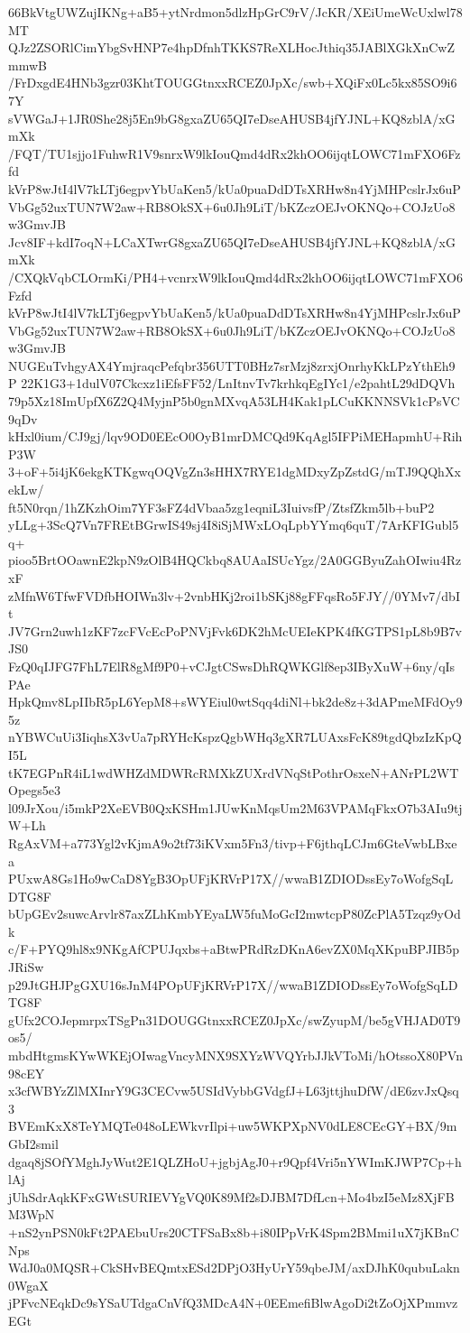 66BkVtgUWZujIKNg+aB5+ytNrdmon5dlzHpGrC9rV/JcKR/XEiUmeWcUxlwl78MT
QJz2ZSORlCimYbgSvHNP7e4hpDfnhTKKS7ReXLHocJthiq35JABlXGkXnCwZmmwB
/FrDxgdE4HNb3gzr03KhtTOUGGtnxxRCEZ0JpXc/swb+XQiFx0Lc5kx85SO9i67Y
sVWGaJ+1JR0She28j5En9bG8gxaZU65QI7eDseAHUSB4jfYJNL+KQ8zblA/xGmXk
/FQT/TU1sjjo1FuhwR1V9snrxW9lkIouQmd4dRx2khOO6ijqtLOWC71mFXO6Fzfd
kVrP8wJtI4lV7kLTj6egpvYbUaKen5/kUa0puaDdDTsXRHw8n4YjMHPcslrJx6uP
VbGg52uxTUN7W2aw+RB8OkSX+6u0Jh9LiT/bKZczOEJvOKNQo+COJzUo8w3GmvJB
Jcv8IF+kdI7oqN+LCaXTwrG8gxaZU65QI7eDseAHUSB4jfYJNL+KQ8zblA/xGmXk
/CXQkVqbCLOrmKi/PH4+vcnrxW9lkIouQmd4dRx2khOO6ijqtLOWC71mFXO6Fzfd
kVrP8wJtI4lV7kLTj6egpvYbUaKen5/kUa0puaDdDTsXRHw8n4YjMHPcslrJx6uP
VbGg52uxTUN7W2aw+RB8OkSX+6u0Jh9LiT/bKZczOEJvOKNQo+COJzUo8w3GmvJB
NUGEuTvhgyAX4YmjraqcPefqbr356UTT0BHz7srMzj8zrxjOnrhyKkLPzYthEh9P
22K1G3+1dulV07Ckcxz1iEfsFF52/LnItnvTv7krhkqEgIYc1/e2pahtL29dDQVh
79p5Xz18ImUpfX6Z2Q4MyjnP5b0gnMXvqA53LH4Kak1pLCuKKNNSVk1cPsVC9qDv
kHxl0ium/CJ9gj/lqv9OD0EEcO0OyB1mrDMCQd9KqAgl5IFPiMEHapmhU+RihP3W
3+oF+5i4jK6ekgKTKgwqOQVgZn3sHHX7RYE1dgMDxyZpZstdG/mTJ9QQhXxekLw/
ft5N0rqn/1hZKzhOim7YF3sFZ4dVbaa5zg1eqniL3IuivsfP/ZtsfZkm5lb+buP2
yLLg+3ScQ7Vn7FREtBGrwIS49sj4I8iSjMWxLOqLpbYYmq6quT/7ArKFIGubl5q+
pioo5BrtOOawnE2kpN9zOlB4HQCkbq8AUAaISUcYgz/2A0GGByuZahOIwiu4RzxF
zMfnW6TfwFVDfbHOIWn3lv+2vnbHKj2roi1bSKj88gFFqsRo5FJY//0YMv7/dbIt
JV7Grn2uwh1zKF7zcFVcEcPoPNVjFvk6DK2hMcUEIeKPK4fKGTPS1pL8b9B7vJS0
FzQ0qIJFG7FhL7ElR8gMf9P0+vCJgtCSwsDhRQWKGlf8ep3IByXuW+6ny/qIsPAe
HpkQmv8LpIIbR5pL6YepM8+sWYEiul0wtSqq4diNl+bk2de8z+3dAPmeMFdOy95z
nYBWCuUi3IiqhsX3vUa7pRYHcKspzQgbWHq3gXR7LUAxsFcK89tgdQbzIzKpQI5L
tK7EGPnR4iL1wdWHZdMDWRcRMXkZUXrdVNqStPothrOsxeN+ANrPL2WTOpegs5e3
l09JrXou/i5mkP2XeEVB0QxKSHm1JUwKnMqsUm2M63VPAMqFkxO7b3AIu9tjW+Lh
RgAxVM+a773Ygl2vKjmA9o2tf73iKVxm5Fn3/tivp+F6jthqLCJm6GteVwbLBxea
PUxwA8Gs1Ho9wCaD8YgB3OpUFjKRVrP17X//wwaB1ZDIODssEy7oWofgSqLDTG8F
bUpGEv2suwcArvlr87axZLhKmbYEyaLW5fuMoGcI2mwtcpP80ZcPlA5Tzqz9yOdk
c/F+PYQ9hl8x9NKgAfCPUJqxbs+aBtwPRdRzDKnA6evZX0MqXKpuBPJIB5pJRiSw
p29JtGHJPgGXU16sJnM4POpUFjKRVrP17X//wwaB1ZDIODssEy7oWofgSqLDTG8F
gUfx2COJepmrpxTSgPn31DOUGGtnxxRCEZ0JpXc/swZyupM/be5gVHJAD0T9os5/
mbdHtgmsKYwWKEjOIwagVncyMNX9SXYzWVQYrbJJkVToMi/hOtssoX80PVn98cEY
x3cfWBYzZlMXInrY9G3CECvw5USIdVybbGVdgfJ+L63jttjhuDfW/dE6zvJxQsq3
BVEmKxX8TeYMQTe048oLEWkvrIlpi+uw5WKPXpNV0dLE8CEcGY+BX/9mGbI2smil
dgaq8jSOfYMghJyWut2E1QLZHoU+jgbjAgJ0+r9Qpf4Vri5nYWImKJWP7Cp+hlAj
jUhSdrAqkKFxGWtSURIEVYgVQ0K89Mf2sDJBM7DfLcn+Mo4bzI5eMz8XjFBM3WpN
+nS2ynPSN0kFt2PAEbuUrs20CTFSaBx8b+i80IPpVrK4Spm2BMmi1uX7jKBnCNps
WdJ0a0MQSR+CkSHvBEQmtxESd2DPjO3HyUrY59qbeJM/axDJhK0qubuLakn0WgaX
jPFvcNEqkDc9sYSaUTdgaCnVfQ3MDcA4N+0EEmefiBlwAgoDi2tZoOjXPmmvzEGt
